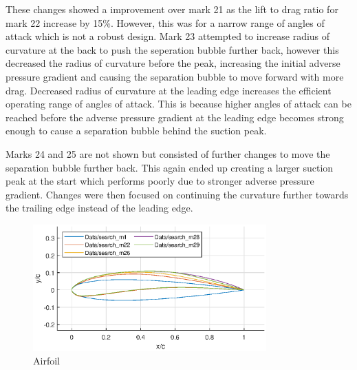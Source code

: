 \documentclass{article}
\begin{document}
These changes showed a improvement over mark 21 as the lift to drag ratio for mark 22 increase by 15\%.
However, this was for a narrow range of angles of attack which is not a robust design.
Mark 23 attempted to increase radius of curvature at the back to push the seperation bubble further back,
however this decreased the radius of curvature before the peak, increasing the initial adverse pressure gradient
and causing the separation bubble to move forward with more drag.
Decreased radius of curvature at the leading edge increases the efficient operating range of angles of attack.
This is because higher angles of attack can be reached before the adverse pressure gradient at the leading edge
becomes strong enough to cause a separation bubble behind the suction peak.

Marks 24 and 25 are not shown but consisted of further changes to move the separation bubble further back.
This again ended up creating a larger suction peak at the start which performs poorly due to stronger adverse pressure gradient.
Changes were then focused on continuing the curvature further towards the trailing edge instead of the leading edge.

\begin{figure}[H]
    \centering
    \includegraphics[width=0.8\textwidth]{figures/loRe_geometry_29.eps}
    \caption{Airfoil}
    \label{fig:m29_geometry}
\end{figure}
\end{document}
